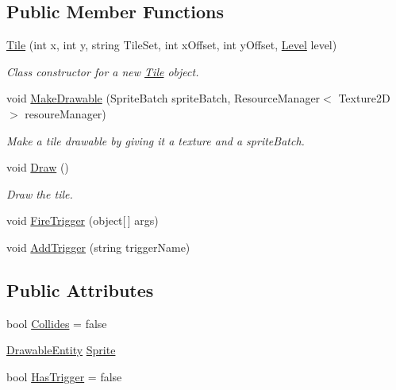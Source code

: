 \subsection*{Public Member Functions}
\begin{DoxyCompactItemize}
\item 
\hyperlink{class_athena_engine_1_1_framework_1_1_gameplay_1_1_tile_aa58d8156d0207a31a1f3ae9ed9f17451}{Tile} (int x, int y, string Tile\-Set, int x\-Offset, int y\-Offset, \hyperlink{class_athena_engine_1_1_framework_1_1_gameplay_1_1_level}{Level} level)
\begin{DoxyCompactList}\small\item\em Class constructor for a new \hyperlink{class_athena_engine_1_1_framework_1_1_gameplay_1_1_tile}{Tile} object. \end{DoxyCompactList}\item 
void \hyperlink{class_athena_engine_1_1_framework_1_1_gameplay_1_1_tile_abfd4056deadc2590bd1f07757873b364}{Make\-Drawable} (Sprite\-Batch sprite\-Batch, Resource\-Manager$<$ Texture2\-D $>$ resoure\-Manager)
\begin{DoxyCompactList}\small\item\em Make a tile drawable by giving it a texture and a sprite\-Batch. \end{DoxyCompactList}\item 
void \hyperlink{class_athena_engine_1_1_framework_1_1_gameplay_1_1_tile_aaf99c16084185fc023d5833c517be838}{Draw} ()
\begin{DoxyCompactList}\small\item\em Draw the tile. \end{DoxyCompactList}\item 
void \hyperlink{class_athena_engine_1_1_framework_1_1_gameplay_1_1_tile_a6277e841cb9acd8d50a2e1d208c6d478}{Fire\-Trigger} (object\mbox{[}$\,$\mbox{]} args)
\item 
void \hyperlink{class_athena_engine_1_1_framework_1_1_gameplay_1_1_tile_a4fe5e325f339dc96f8bf040ca8d5dc1a}{Add\-Trigger} (string trigger\-Name)
\end{DoxyCompactItemize}
\subsection*{Public Attributes}
\begin{DoxyCompactItemize}
\item 
bool \hyperlink{class_athena_engine_1_1_framework_1_1_gameplay_1_1_tile_aaa1943b0ddb6d4371980934b0d931ef7}{Collides} = false
\item 
\hyperlink{class_athena_engine_1_1_framework_1_1_primatives_1_1_drawable_entity}{Drawable\-Entity} \hyperlink{class_athena_engine_1_1_framework_1_1_gameplay_1_1_tile_aa98f08e02a32fdcc3455d297baa1a5fd}{Sprite}
\item 
bool \hyperlink{class_athena_engine_1_1_framework_1_1_gameplay_1_1_tile_a4265d7725c1393ad8eaa17b4e8b5ff05}{Has\-Trigger} = false
\end{DoxyCompactItemize}
